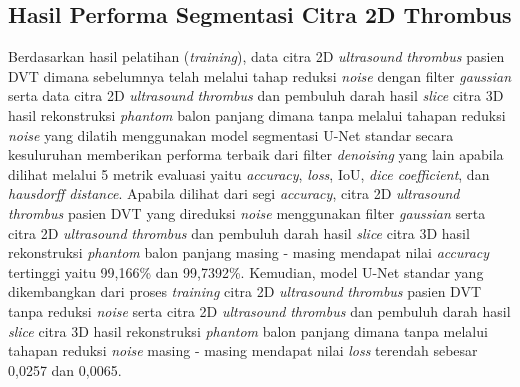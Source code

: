 \subsection{Hasil Performa Segmentasi Citra 2D Thrombus}

Berdasarkan hasil pelatihan (\textit{training}), data citra 2D \textit{ultrasound} \textit{thrombus} pasien DVT dimana sebelumnya telah melalui tahap reduksi \textit{noise} dengan filter \textit{gaussian} serta data citra 2D \textit{ultrasound} \textit{thrombus} dan pembuluh darah hasil \textit{slice} citra 3D hasil rekonstruksi \textit{phantom} balon panjang dimana tanpa melalui tahapan reduksi \textit{noise} yang dilatih menggunakan model segmentasi U-Net standar secara kesuluruhan memberikan performa terbaik dari filter \textit{denoising} yang lain apabila dilihat melalui 5 metrik evaluasi yaitu \textit{accuracy}, \textit{loss}, IoU, \textit{dice coefficient}, dan \textit{hausdorff distance}. Apabila dilihat dari segi \textit{accuracy}, citra 2D \textit{ultrasound} \textit{thrombus} pasien DVT yang direduksi \textit{noise} menggunakan filter \textit{gaussian} serta citra 2D \textit{ultrasound} \textit{thrombus} dan pembuluh darah hasil \textit{slice} citra 3D hasil rekonstruksi \textit{phantom} balon panjang masing - masing mendapat nilai \textit{accuracy} tertinggi yaitu 99,166\% dan 99,7392\%. Kemudian, model U-Net standar yang dikembangkan dari proses \textit{training} citra 2D \textit{ultrasound} \textit{thrombus} pasien DVT tanpa reduksi \textit{noise} serta citra 2D \textit{ultrasound} \textit{thrombus} dan pembuluh darah hasil \textit{slice} citra 3D hasil rekonstruksi \textit{phantom} balon panjang dimana tanpa melalui tahapan reduksi \textit{noise} masing - masing mendapat nilai \textit{loss} terendah sebesar 0,0257 dan 0,0065.

